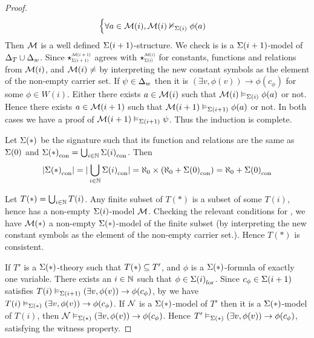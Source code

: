 \begin{proof}
\[\begin{cases}
            \forall a \in {\mathcal{M}(i)}, \mathcal{M}(i) \nvDash_{\Sigma(i)} \phi(a)
        \end{cases}
        \]
    Then $\mathcal{M}$ is a well defined $\Sigma(i+1)$-structure.
    We check is is a $\Sigma(i+1)$-model of $\Delta_T \cup \Delta_w$.
    Since 
    $\intp{\Si(i+1)}{\MM(i+1)}$ agrees with 
    $\intp{\Si(i)}{\MM(i)}$ for constants, 
    functions and relations from $\mathcal{M}(i)$,
    and ${\MM(i)} \ne \empty$
    by interpreting the new constant symbols as the 
    element of the non-empty carrier set.
    If $\psi \in \Delta_w$ then it is 
    $(\exists v, \phi(v)) \to \phi(c_\phi)$ for some 
    $\phi \in W(i)$.
    Either there exists $a \in {\mathcal{M}(i)}$ 
    such that $\mathcal{M}(i) \vDash_{\Sigma(i)} \phi(a)$ or not.
    Hence there exists $a \in {\mathcal{M}(i+1)}$ 
    such that $\mathcal{M}(i+1) \vDash_{\Sigma(i+1)} \phi(a)$ or not.
    In both cases we have a proof of $\mathcal{M}(i+1) \vDash_{\Sigma(i+1)} \psi$.
    Thus the induction is complete.

    Let $\Sigma(*)$ 
    be the signature such that its function and relations 
    are the same as $\Sigma(0)$
    and ${\Sigma(*)}_\mathrm{con} = \bigcup_{i \in \mathbb{N}} {\Sigma(i)}_\mathrm{con}$.
    Then 
    \[
        |{\Sigma(*)}_\mathrm{con}| = |\bigcup_{i \in \mathbb{N}} {\Sigma(i)}_\mathrm{con}| = 
        \aleph_0 \times (\aleph_0 + {\Sigma(0)}_\mathrm{con}) = 
        \aleph_0 + {\Sigma(0)}_\mathrm{con}
    \]

    Let $T(*) = \bigcup_{i \in \mathbb{N}} T(i)$.
    Any finite subset of $T(*)$ is a subset of some
    $T(i)$, 
    hence has a non-empty $\Sigma(i)$-model $\mathcal{M}$.
    Checking the relevant conditions for
    ,
    we have
    $\mathcal{M}(*)$ a non-empty $\Sigma(*)$-model of the finite subset
    (by interpreting the new constant symbols as the 
    element of the non-empty carrier set.).
    Hence $T(*)$ is consistent.
    
    If $T'$ is a $\Sigma(*)$-theory such that $T(*) \subseteq T'$,
    and $\phi$ is a $\Sigma(*)$-formula of exactly one variable.
    There exists an $i \in \mathbb{N}$ such that $\phi \in {\Sigma(i)}_\mathrm{for}$.
    Since $c_\phi \in \Sigma(i+1)$ satisfies 
    $T(i) \vDash_{\Sigma(i+1)} \left(\exists v, \phi(v)\right) \to \phi(c_\phi)$,
    by 
    we have 
    $T(i) \vDash_{\Sigma(*)} \left(\exists v, \phi(v)\right) \to \phi(c_\phi)$.
    If $\mathcal{N}$ is a $\Sigma(*)$-model of $T'$
    then it is a $\Sigma(*)$-model of $T(i)$,
    then $\mathcal{N} \vDash_{\Sigma(*)} \left(\exists v, \phi(v)\right) \to \phi(c_\phi)$.
    Hence $T' \vDash_{\Sigma(*)} \left(\exists v, \phi(v)\right) \to \phi(c_\phi)$,
    satisfying the witness property.
\end{proof}


